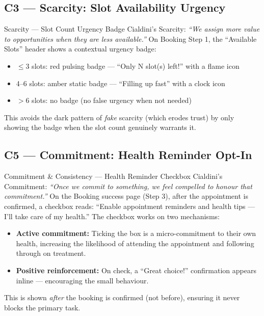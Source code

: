 \documentclass[12pt, a4paper]{article}
\begin{document}
\subsection{C3 --- Scarcity: Slot Availability Urgency}

\begin{featurebox}{Scarcity --- Slot Count Urgency Badge}
Cialdini's Scarcity: \textit{``We assign more value to opportunities when they are less available.''} On Booking Step 1, the ``Available Slots'' header shows a contextual urgency badge:
\begin{itemize}[leftmargin=1.5em, itemsep=0pt]
  \item $\leq 3$ slots: red pulsing badge --- ``Only N slot(s) left!'' with a flame icon
  \item 4--6 slots: amber static badge --- ``Filling up fast'' with a clock icon
  \item $>6$ slots: no badge (no false urgency when not needed)
\end{itemize}
This avoids the dark pattern of \emph{fake} scarcity (which erodes trust) by only showing the badge when the slot count genuinely warrants it.
\end{featurebox}

\subsection{C5 --- Commitment: Health Reminder Opt-In}

\begin{featurebox}{Commitment \& Consistency --- Health Reminder Checkbox}
Cialdini's Commitment: \textit{``Once we commit to something, we feel compelled to honour that commitment.''} On the Booking success page (Step 3), after the appointment is confirmed, a checkbox reads: ``Enable appointment reminders and health tips --- I'll take care of my health.'' The checkbox works on two mechanisms:
\begin{itemize}[leftmargin=1.5em, itemsep=0pt]
  \item \textbf{Active commitment:} Ticking the box is a micro-commitment to their own health, increasing the likelihood of attending the appointment and following through on treatment.
  \item \textbf{Positive reinforcement:} On check, a ``\checkmark Great choice!'' confirmation appears inline --- encouraging the small behaviour.
\end{itemize}
This is shown \emph{after} the booking is confirmed (not before), ensuring it never blocks the primary task.
\end{featurebox}
\end{document}

